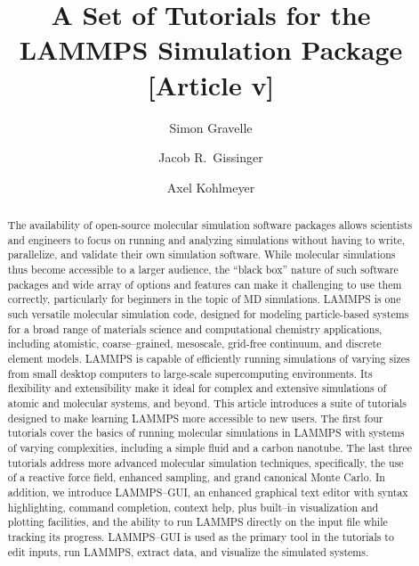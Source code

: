 \documentclass[9pt,tutorial]{livecoms}
\title{A Set of Tutorials for the LAMMPS Simulation Package [Article v\versionnumber]}
\author[1*]{Simon Gravelle}
\affil[1]{University Grenoble Alpes, CNRS, LIPhy, Grenoble, 38000, France}
\author[2]{Jacob R.~Gissinger}
\affil[2]{Stevens Institute of Technology, Hoboken, NJ 07030, USA}
\author[3]{Axel Kohlmeyer}
\affil[3]{Institute for Computational Molecular Science, Temple University, Philadelphia, PA 19122, USA}
\begin{document}
\begin{frontmatter}
\maketitle


\begin{abstract}
  The availability of open-source molecular simulation software packages
  allows scientists and engineers to focus on running and analyzing
  simulations without having to write, parallelize, and validate their
  own simulation software.  While molecular simulations thus become
  accessible to a larger audience, the ``black box'' nature of such
  software packages and wide array of options and features can make it
  challenging to use them correctly, particularly for beginners in the
  topic of MD simulations.  LAMMPS is one such versatile molecular
  simulation code, designed for modeling particle-based systems for a
  broad range of materials science and computational chemistry
  applications, including atomistic, coarse--grained, mesoscale,
  grid-free continuum, and discrete element models.  LAMMPS is capable
  of efficiently running simulations of varying sizes from small desktop
  computers to large-scale supercomputing environments.  Its flexibility
  and extensibility make it ideal for complex and extensive simulations
  of atomic and molecular systems, and beyond.  This article introduces a
  suite of tutorials designed to make learning LAMMPS more accessible to
  new users.  The first four tutorials cover the basics of running
  molecular simulations in LAMMPS with systems of varying complexities,
  including a simple fluid and a carbon nanotube.  The last three
  tutorials address more advanced molecular simulation techniques,
  specifically, the use of a reactive force field, enhanced sampling, and
  grand canonical Monte Carlo.
  In addition, we introduce LAMMPS--GUI, an enhanced graphical text
  editor with syntax highlighting, command completion, context help,
  plus built--in visualization and plotting facilities, and the ability
  to run LAMMPS directly on the input file while tracking its progress.
  LAMMPS--GUI is used as the primary tool in the tutorials to edit
  inputs, run LAMMPS, extract data, and visualize the simulated systems.
\end{abstract}

\end{frontmatter}
\end{document}
